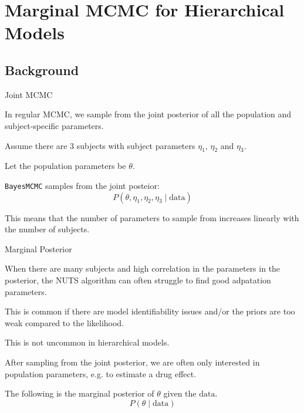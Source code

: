 
\section{Marginal MCMC for Hierarchical Models}

\subsection{Background}
\begin{frame}{Joint MCMC}
	\begin{vfilleditems}
		\item In regular MCMC, we sample from the joint posterior of all the population and subject-specific parameters.
		\item Assume there are 3 subjects with subject parameters $\eta_1$, $\eta_2$ and $\eta_3$.
		\item Let the population parameters be $\theta$.
		\item \lstinline{BayesMCMC} samples from the joint posteior:
		$$
			P(\theta, \eta_1, \eta_2, \eta_3 \mid \text{data})
		$$
		\item This means that the number of parameters to sample from increases linearly with the number of subjects.
	\end{vfilleditems}
\end{frame}

\begin{frame}{Marginal Posterior}
	\begin{vfilleditems}
		\item When there are many subjects and high correlation in the parameters in the posterior, the NUTS algorithm can often struggle to find good adpatation parameters.
		\item This is common if there are model identifiability issues and/or the priors are too weak compared to the likelihood.
		\item This is not uncommon in hierarchical models.
		\item After sampling from the joint posterior, we are often only interested in population parameters, e.g. to estimate a drug effect.
		\item The following is the marginal posterior of $\theta$ given the $\text{data}$.
		$$
			P(\theta \mid \text{data})
		$$
	\end{vfilleditems}
\end{frame}

